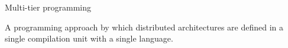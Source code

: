 \begin{frame}{Multi-tier programming~\cite{DBLP:journals/csur/WeisenburgerWS20}}
  \begin{cardTiny}
  {
    \color{accent} A programming approach by which distributed architectures 
    are defined in a single compilation unit with a single language. 
  }
  \end{cardTiny}
  \centering
\end{frame}